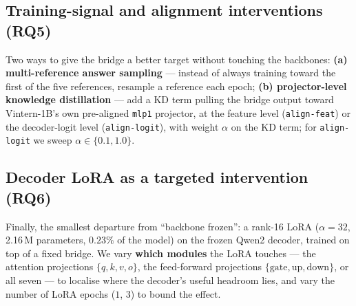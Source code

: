 \subsection{Training-signal and alignment interventions (RQ5)}
\label{sec:method-rq5}

Two ways to give the bridge a better target without touching the backbones:
\textbf{(a) multi-reference answer sampling} --- instead of always training toward
the first of the five references, resample a reference each epoch;
\textbf{(b) projector-level knowledge distillation} --- add a KD term pulling the
bridge output toward Vintern-1B's own pre-aligned \texttt{mlp1} projector, at the
feature level (\texttt{align-feat}) or the decoder-logit level
(\texttt{align-logit}), with weight $\alpha$ on the KD term; for
\texttt{align-logit} we sweep $\alpha \in \{0.1, 1.0\}$.

\subsection{Decoder LoRA as a targeted intervention (RQ6)}
\label{sec:method-rq6}

Finally, the smallest departure from ``backbone frozen'': a rank-16 LoRA
($\alpha = 32$, 2.16\,M parameters, $0.23\%$ of the model) on the frozen Qwen2
decoder, trained on top of a fixed bridge. We vary \textbf{which modules} the
LoRA touches --- the attention projections $\{q,k,v,o\}$, the feed-forward
projections $\{\text{gate},\text{up},\text{down}\}$, or all seven --- to localise
where the decoder's useful headroom lies, and vary the number of LoRA epochs
($1$, $3$) to bound the effect.
